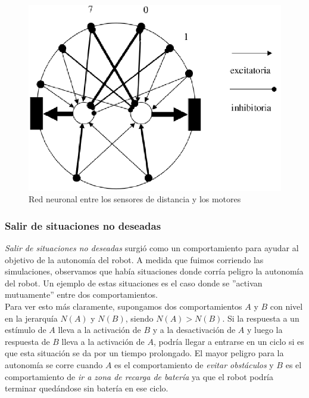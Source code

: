 \begin{figure}[htp]
\begin{center}
\includegraphics[scale=0.4]{comportamientos/red.png}
\caption{Red neuronal entre los sensores de distancia y los motores}
\label{fig:redN}
\end{center}
\end{figure}

\subsubsection{Salir de situaciones no deseadas}
\label{out_of_unwanted_situations}
\emph{Salir de situaciones no deseadas} surgi\'o como un comportamiento
para ayudar al objetivo de la autonom\'ia del robot. A medida que fuimos
corriendo las simulaciones, observamos que hab\'ia situaciones donde corr\'ia
peligro la autonom\'ia del robot. Un ejemplo de estas situaciones es el caso
donde se ''activan mutuamente'' entre dos comportamientos.
\\
Para ver esto m\'as claramente, supongamos dos comportamientos $A$ y $B$ con
nivel en la jerarqu\'ia $N(A)$ y $N(B)$, siendo $N(A) > N(B)$. Si la respuesta
a un est\'imulo de $A$ lleva a la activaci\'on de $B$ y a la desactivaci\'on de $A$
y luego la respuesta de $B$ lleva a la activaci\'on de $A$, podr\'ia llegar a
entrarse en un ciclo si es que esta situaci\'on se da por un tiempo prolongado.
El mayor peligro para la autonom\'ia se corre cuando $A$ es el comportamiento
de \emph{evitar obst\'aculos} y $B$ es el comportamiento de \emph{ir a zona
de recarga de bater\'ia} ya que el robot podr\'ia terminar qued\'andose sin
bater\'ia en ese ciclo.
